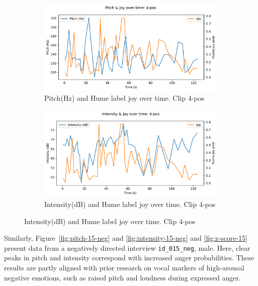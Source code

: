\begin{figure}[H]
    \centering
    \begin{subfigure}[b]{0.47\textwidth}
        \includegraphics[width=\linewidth]{png/results/rq1/pitch_joy_4-pos.pdf}
        \caption{Pitch(Hz) and Hume label joy over time. Clip 4-pos}
        \label{fig:pitch-4-pos}
    \end{subfigure}
    \hspace{0.04\textwidth}
    \begin{subfigure}[b]{0.47\textwidth}
        \includegraphics[width=\linewidth]{png/results/rq1/intensity_joy_4-pos.pdf}
        \caption{Intensity(dB) and Hume label joy over time. Clip 4-pos}
        \label{fig:intensity-4-pos}
    \end{subfigure}
\end{figure}

Similarly, Figure~\ref{fig:pitch-15-neg} and \ref{fig:intensity-15-neg} and \ref{fig:z-score-15} present data from a negatively directed interview \texttt{id\_015\_neg}, male. Here, clear peaks in pitch and intensity correspond with increased anger probabilities. These results are partly aligned with prior research on vocal markers of high-arousal negative emotions, such as raised pitch and loudness during expressed anger. 

